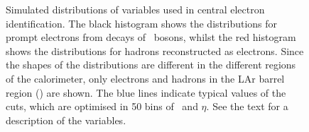 \begin{figure}[h]
\centering
    \caption[Distributions of electron identification variables for electrons
    and hadrons with : $\Delta \eta$, $\Delta \phi$, \dzero,
    $E/p$, \fthree]
    {\small Simulated distributions of variables used in central electron
    identification. The black histogram shows the distributions for prompt
    electrons from decays of \Z\ bosons, whilst the red histogram shows the
    distributions for hadrons reconstructed as electrons. Since the shapes of
    the distributions are different in the different regions of the calorimeter,
    only electrons and hadrons in the LAr barrel region () are
    shown. The blue lines indicate typical values of the cuts, which are
    optimised in 50 bins of \pt\ and $\eta$. See the text for a description of
    the variables.}
    \label{fig:el-id-showershapes-central-2}
\end{figure}

